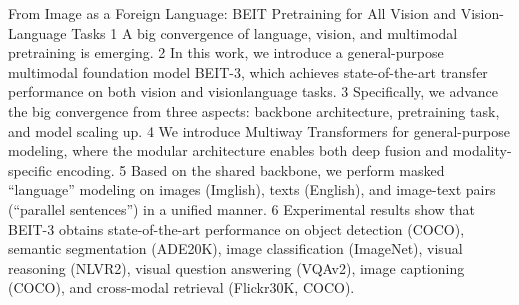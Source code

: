   


 From Image as a Foreign Language: BEIT Pretraining for All Vision and Vision-Language Tasks
 1 A big convergence of language, vision, and multimodal pretraining is emerging. 
 2 In this work, we introduce a general-purpose multimodal foundation model BEIT-3, which achieves state-of-the-art transfer performance on both vision and visionlanguage tasks. 
 3 Specifically, we advance the big convergence from three aspects: backbone architecture, pretraining task, and model scaling up. 
 4 We introduce Multiway Transformers for general-purpose modeling, where the modular architecture enables both deep fusion and modality-specific encoding. 
 5 Based on the shared backbone, we perform masked “language” modeling on images (Imglish), texts (English), and image-text pairs (“parallel sentences”) in a unified manner. 
 6 Experimental results show that BEIT-3 obtains state-of-the-art performance on object detection (COCO), semantic segmentation (ADE20K), image classification (ImageNet), visual reasoning (NLVR2), visual question answering (VQAv2), image captioning (COCO), and cross-modal retrieval (Flickr30K, COCO).


